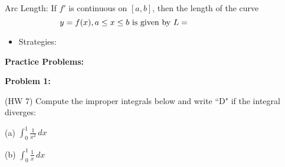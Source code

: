 \documentclass[12pt]{report}
\newcommand{\ds}{\displaystyle}
\begin{document}
\item Arc Length: If $f'$ is continuous on $[a,b]$, then the length of the curve $$\hspace{-1in}y=f(x), a \leq x \leq b \text{ is given by } L = $$

\begin{itemize}

\item Strategies: %

\vspace{.75in}


%
%
%
%
%
%
%
%
%
%
%
%
%


\end{itemize} 



\newpage


\noindent\textbf{Practice Problems:}

\medskip

\noindent\textbf{Problem 1: }

\medskip

\noindent (HW 7) Compute the improper integrals below and write ``D" if the integral diverges:

\medskip

(a) $\ds \int_0^1 \frac{1}{x^2} \, dx$\\

\medskip

(b) $\ds \int_0^1 \frac{1}{x} \, dx$\\
\end{document}
